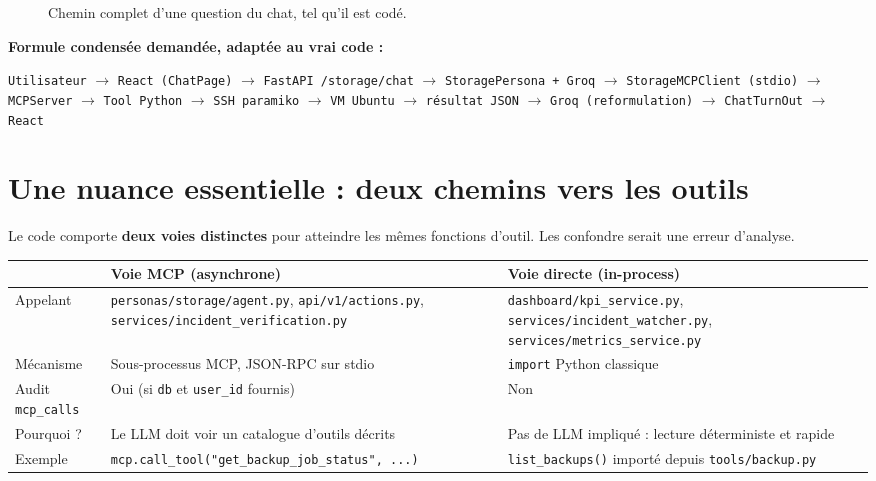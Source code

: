 \documentclass[11pt,a4paper]{report}
\newcommand{\file}[1]{\texttt{\small #1}}
\newcommand{\fn}[1]{\texttt{\small\textcolor{oasisviolet}{#1}}}
\newcommand{\tbl}[1]{\texttt{\small\textcolor{oasisamber}{#1}}}
\newcommand{\arrowto}{\ensuremath{\rightarrow}}
\begin{document}
\begin{figure}[h!]
\caption{Chemin complet d'une question du chat, tel qu'il est codé.}
\end{figure}

\clearpage

\begin{keybox}
\textbf{Formule condensée demandée, adaptée au vrai code :}
\medskip

\noindent
\texttt{Utilisateur} \arrowto{} \texttt{React (ChatPage)} \arrowto{}
\texttt{FastAPI /storage/chat} \arrowto{} \texttt{StoragePersona + Groq}
\arrowto{} \texttt{StorageMCPClient (stdio)} \arrowto{}
\texttt{MCPServer} \arrowto{} \texttt{Tool Python} \arrowto{}
\texttt{SSH paramiko} \arrowto{} \texttt{VM Ubuntu} \arrowto{}
\texttt{résultat JSON} \arrowto{} \texttt{Groq (reformulation)} \arrowto{}
\texttt{ChatTurnOut} \arrowto{} \texttt{React}
\end{keybox}

\section{Une nuance essentielle : deux chemins vers les outils}

Le code comporte \textbf{deux voies distinctes} pour atteindre les mêmes
fonctions d'outil. Les confondre serait une erreur d'analyse.

\begin{longtable}{@{}p{4.2cm}p{5.1cm}p{5.2cm}@{}}
\toprule
& \textbf{Voie MCP (asynchrone)} & \textbf{Voie directe (in-process)}\\
\midrule
\endhead
Appelant & \file{personas/storage/agent.py}, \file{api/v1/actions.py}, \file{services/incident\_verification.py} & \file{dashboard/kpi\_service.py}, \file{services/incident\_watcher.py}, \file{services/metrics\_service.py}\\
Mécanisme & Sous-processus MCP, JSON-RPC sur stdio & \texttt{import} Python classique\\
Audit \tbl{mcp\_calls} & Oui (si \texttt{db} et \texttt{user\_id} fournis) & Non\\
Pourquoi ? & Le LLM doit voir un catalogue d'outils décrits & Pas de LLM impliqué : lecture déterministe et rapide\\
Exemple & \fn{mcp.call\_tool("get\_backup\_job\_status", ...)} & \fn{list\_backups()} importé depuis \file{tools/backup.py}\\
\bottomrule
\end{longtable}
\end{document}
